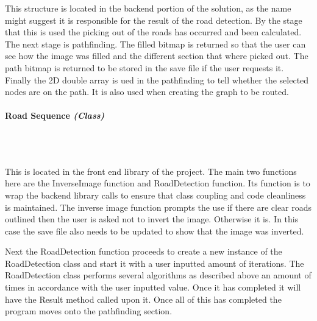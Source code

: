 \begin{FlushLeft}
    This structure is located in the backend portion of the solution, as the name might suggest it is responsible for the result of the road detection. By the stage that this is used the picking out of the roads has occurred and been calculated. The next stage is pathfinding. The filled bitmap is returned so that the user can see how the image was filled and the different section that where picked out. The path bitmap is returned to be stored in the save file if the user requests it. Finally the 2D double array is ued in the pathfinding to tell whether the selected nodes are on the path. It is also used when creating the graph to be routed.\\

    \bk

\paragraph{Road Sequence \textit{(Class)}} \mbox{} \\

    \begin{figure}[H]
        \centering
    \end{figure}\\

    This is located in the front end library of the project. The main two functions here are the InverseImage function and RoadDetection function. Its function is to wrap the backend library calls to ensure that class coupling and code cleanliness is maintained. The inverse image function prompts the use if there are clear roads outlined then the user is asked not to invert the image. Otherwise it is. In this case the save file also needs to be updated to show that the image was inverted. \\ \bk

    Next the RoadDetection function proceeds to create a new instance of the RoadDetection class and start it with a user inputted amount of iterations. The RoadDetection class performs several algorithms as described above an amount of times in accordance with the user inputted value. Once it has completed it will have the Result method called upon it. Once all of this has completed the program moves onto the pathfinding section.\\
    \bk


\end{FlushLeft}

